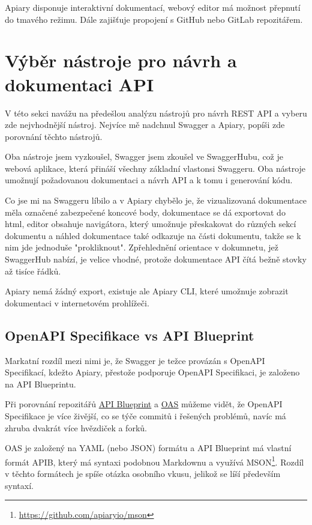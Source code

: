 \documentclass[thesis=B,czech]{FITthesis}[2012/06/26]
\begin{document}
            Apiary disponuje interaktivní dokumentací, webový editor má možnost přepnutí do tmavého režimu. Dále zajišťuje propojení s GitHub nebo GitLab repozitářem.

    \section{Výběr nástroje pro návrh a dokumentaci API}
        V této sekci navážu na předešlou analýzu nástrojů pro návrh REST API a vyberu zde nejvhodnější nástroj. Nejvíce mě nadchnul Swagger a Apiary, popíši zde porovnání těchto nástrojů.
        

        Oba nástroje jsem vyzkoušel, Swagger jsem zkoušel ve SwaggerHubu, což je webová aplikace, která přináší všechny základní vlastonsi Swaggeru. Oba nástroje umožnují požadovanou dokumentaci a návrh API a k tomu i generování kódu.
        
        Co jse mi na Swaggeru líbilo a v Apiary chybělo je, že vizualizovaná dokumentace měla označené zabezpečené koncové body, dokumentace se dá exportovat do html, editor obsahuje navigátora, který umožnuje přeskakovat do různých sekcí dokumentu a náhled dokumentace také odkazuje na části dokumentu, takže se k nim jde jednoduše "prokliknout". Zpřehlednění orientace v dokumnetu, jež SwaggerHub nabízí, je velice vhodné, protože dokumentace API čítá bežně stovky až tisíce řádků.
        
        Apiary nemá žádný export, existuje ale Apiary CLI, které umožnuje zobrazit dokumentaci v internetovém prohlížeči.
                
        \subsection{OpenAPI Specifikace vs API Blueprint}
            Markatní rozdíl mezi nimi je, že Swagger je težce provázán s OpenAPI Specifikací, kdežto Apiary, přestože podporuje OpenAPI Specifikaci, je založeno na API Blueprintu.

            Při porovnání repozitářů \href{https://github.com/apiaryio/api-blueprint/graphs/contributors}{API Blueprint} a \href{https://github.com/OAI/OpenAPI-Specification/graphs/contributors}{OAS} můžeme vidět, že OpenAPI Specifikace je více živější, co se týče commitů i řešených problémů, navíc má zhruba dvakrát více hvězdiček a forků.
            
            OAS je založený na YAML (nebo JSON) formátu a API Blueprint má vlastní formát APIB, který má syntaxi podobnou Markdownu a využívá MSON\footnote{\url{https://github.com/apiaryio/mson}}. Rozdíl v těchto formátech je spíše otázka osobního vkusu, jelikož se líší především syntaxí.
\end{document}
